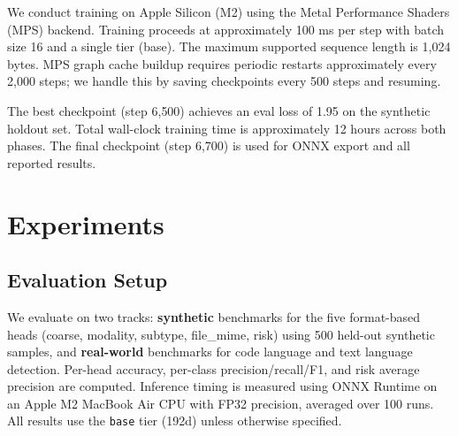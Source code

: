 \documentclass[11pt,a4paper]{article}
\begin{document}
We conduct training on Apple Silicon (M2) using the Metal Performance Shaders (MPS) backend.
Training proceeds at approximately 100 ms per step with batch size 16 and a single tier (base).
The maximum supported sequence length is 1{,}024 bytes.
MPS graph cache buildup requires periodic restarts approximately every 2{,}000 steps; we handle this by saving checkpoints every 500 steps and resuming.

The best checkpoint (step 6{,}500) achieves an eval loss of 1.95 on the synthetic holdout set.
Total wall-clock training time is approximately 12 hours across both phases.
The final checkpoint (step 6{,}700) is used for ONNX export and all reported results.

\section{Experiments}
\label{sec:experiments}

\subsection{Evaluation Setup}

We evaluate on two tracks: \textbf{synthetic} benchmarks for the five format-based heads (coarse, modality, subtype, file\_mime, risk) using 500 held-out synthetic samples, and \textbf{real-world} benchmarks for code language and text language detection.
Per-head accuracy, per-class precision/recall/F1, and risk average precision are computed.
Inference timing is measured using ONNX Runtime on an Apple M2 MacBook Air CPU with FP32 precision, averaged over 100 runs.
All results use the \texttt{base} tier (192d) unless otherwise specified.
\end{document}
